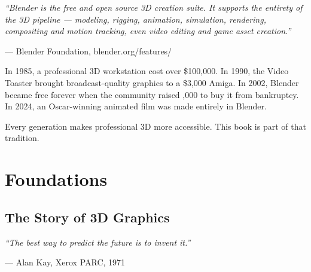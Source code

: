 \documentclass[11pt,letterpaper,twoside,openright]{book}
\begin{document}
\thispagestyle{empty}
\vspace*{3cm}
\begin{quotebox}
\itshape ``Blender is the free and open source 3D creation suite. It supports the entirety of the 3D pipeline --- modeling, rigging, animation, simulation, rendering, compositing and motion tracking, even video editing and game asset creation.''

\vspace{0.5em}
\upshape --- Blender Foundation, blender.org/features/
\end{quotebox}

\vspace{2cm}

\begin{historynote}
In 1985, a professional 3D workstation cost over \$100,000. In 1990, the Video Toaster brought broadcast-quality graphics to a \$3,000 Amiga. In 2002, Blender became free forever when the community raised ,000 to buy it from bankruptcy. In 2024, an Oscar-winning animated film was made entirely in Blender.

Every generation makes professional 3D more accessible. This book is part of that tradition.
\end{historynote}
\newpage

\setcounter{tocdepth}{2}
\tableofcontents
\newpage


\part{Foundations}

\chapter{The Story of 3D Graphics}
\label{ch:history}

\begin{quotebox}
\itshape ``The best way to predict the future is to invent it.''

\upshape --- Alan Kay, Xerox PARC, 1971
\end{quotebox}
\end{document}
